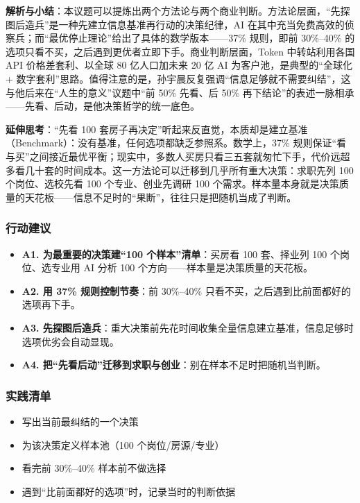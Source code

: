 \textbf{解析与小结}：本议题可以提炼出两个方法论与两个商业判断。方法论层面，``先探图后造兵''是一种先建立信息基准再行动的决策纪律，AI
在其中充当免费高效的侦察兵；而``最优停止理论''给出了具体的数学版本------37\%
规则，即前 30\%--40\%
的选项只看不买，之后遇到更优者立即下手。商业判断层面，Token
中转站利用各国 API 价格差套利、以全球 80 亿人口加未来 20 亿 AI
为客户池，是典型的``全球化 +
数字套利''思路。值得注意的是，孙宇晨反复强调``信息足够就不需要纠结''，这与他后来在``人生的意义''议题中``前
50\% 先看、后 50\%
再下结论''的表述一脉相承------先看、后动，是他决策哲学的统一底色。

\textbf{延伸思考}：``先看 100
套房子再决定''听起来反直觉，本质却是建立基准（Benchmark）：没有基准，任何选项都缺乏参照系。数学上，37\%
规则保证``看与买''之间接近最优平衡；现实中，多数人买房只看三五套就匆忙下手，代价远超多看几十套的时间成本。这一方法论可以迁移到几乎所有重大决策：求职先列
100 个岗位、选校先看 100 个专业、创业先调研 100
个需求。样本量本身就是决策质量的天花板------信息不足时的``果断''，往往只是把随机当成了判断。

\subsubsection{行动建议}

\begin{itemize}
\tightlist
\item
  \textbf{A1. 为最重要的决策建``100 个样本''清单}：买房看 100 套、择业列
  100 个岗位、选专业用 AI 分析 100
  个方向------样本量是决策质量的天花板。
\item
  \textbf{A2. 用 37\% 规则控制节奏}：前 30\%--40\%
  只看不买，之后遇到比前面都好的选项再下手。
\item
  \textbf{A3.
  先探图后造兵}：重大决策前先花时间收集全量信息建立基准，信息足够时选项优劣会自动显现。
\item
  \textbf{A4.
  把``先看后动''迁移到求职与创业}：别在样本不足时把随机当判断。
\end{itemize}

\subsubsection{实践清单}

\begin{itemize}
\tightlist
\item[$\square$]
  写出当前最纠结的一个决策
\item[$\square$]
  为该决策定义样本池（100 个岗位/房源/专业）
\item[$\square$]
  看完前 30\%--40\% 样本前不做选择
\item[$\square$]
  遇到``比前面都好的选项''时，记录当时的判断依据
\end{itemize}

